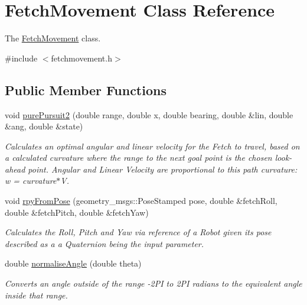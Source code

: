 \hypertarget{classFetchMovement}{}\section{Fetch\+Movement Class Reference}
\label{classFetchMovement}


The \hyperlink{classFetchMovement}{Fetch\+Movement} class.  




{\ttfamily \#include $<$fetchmovement.\+h$>$}

\subsection*{Public Member Functions}
\begin{DoxyCompactItemize}
\item 
void \hyperlink{classFetchMovement_a1bf728d52720e41eda38728ebc0b43f8}{pure\+Pursuit2} (double range, double x, double bearing, double \&lin, double \&ang, double \&state)
\begin{DoxyCompactList}\small\item\em Calculates an optimal angular and linear velocity for the Fetch to travel, based on a calculated curvature where the range to the next goal point is the chosen \textquotesingle{}look-\/ahead point\textquotesingle{}. Angular and Linear Velocity are proportional to this path curvature\+: w = curvature$\ast$V. \end{DoxyCompactList}\item 
void \hyperlink{classFetchMovement_a26cbc437959bf16582bc57a4e1c64b58}{rpy\+From\+Pose} (geometry\+\_\+msgs\+::\+Pose\+Stamped pose, double \&fetch\+Roll, double \&fetch\+Pitch, double \&fetch\+Yaw)
\begin{DoxyCompactList}\small\item\em Calculates the Roll, Pitch and Yaw via reference of a Robot given its pose described as a a Quaternion being the input parameter. \end{DoxyCompactList}\item 
double \hyperlink{classFetchMovement_af68c8b26e41ca9c6bca4dba2ccaf5643}{normalise\+Angle} (double theta)
\begin{DoxyCompactList}\small\item\em Converts an angle outside of the range -\/2\+PI to 2\+PI radians to the equivalent angle inside that range. \end{DoxyCompactList}\end{DoxyCompactItemize}


